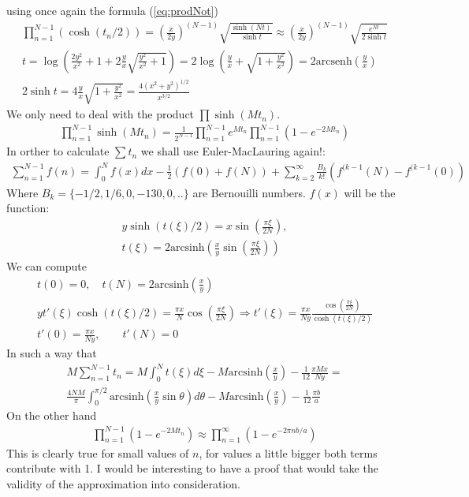 \documentclass[12pt]{article}
\begin{document}
using once again the formula (\ref{eq:prodNot})
\begin{gather}
\prod_{n=1}^{N-1}\left(\cosh(t_n/2)\right)=\left(\frac{x}{2y}\right)^{(N-1)}\sqrt{\frac{\sinh(Nt)}{\sinh t}}
\approx \left(\frac{x}{2y}\right)^{(N-1)} \sqrt{\frac{e^{Nt}}{2\sinh t}}\\
t=\log\left(\frac{2y^2}{x^2}+1+2\frac{y}{x}\sqrt{\frac{y^2}{x^2}+1}\right)=2\log\left(\frac{y}{x}+\sqrt{1+\frac{y^2}{x^2}}\right)=2\textrm{arcsenh}\left(\frac{y}{x}\right)\\
2\sinh t=4\frac{y}{x}\sqrt{1+\frac{y^2}{x^2}}=\frac{4\left(x^2+y^2\right)^{1/2}}{x^{3/2}}
\end{gather}
We only need to deal with the product $\prod \sinh(Mt_n)$.
\begin{gather}
\prod_{n=1}^{N-1}\sinh(Mt_n)=\frac{1}{2^{N-1}} \prod_{n=1}^{N-1}e^{Mt_n} \prod_{n=1}^{N-1}(1-e^{-2Mt_n})
\end{gather}
In orther to calculate $\sum t_n$ we shall use Euler-MacLauring again!:
\begin{gather}
\sum_{n=1}^{N-1}f(n)=\int_0^N f(x)dx-\frac{1}{2}\left(f(0)+f(N)\right)+\sum_{k=2}^\infty\frac{B_{k}}{k!}\left(f^{(k-1}(N)-f^{(k-1}(0)\right)
\end{gather}
Where $B_{k}=\{-1/2,1/6,0,-130,0,..\}$ are Bernouilli numbers. $f(x)$ will be the function:
\begin{gather}
y\sinh\left(t\left(\xi\right)/2\right)=x\sin\left(\frac{\pi \xi}{2N}\right), \\
t\left(\xi\right)=2\textrm{arcsinh}\left(\frac{x}{y}\sin\left(\frac{\pi \xi}{2N}\right)\right)
\end{gather}
We can compute
\begin{gather}
t(0)=0,\quad t(N)=2\textrm{arcsinh}\left(\frac{x}{y}\right) \\
yt'(\xi)\cosh\left(t\left(\xi\right)/2\right)=\frac{\pi x}{N}\cos\left(\frac{\pi \xi}{2N}\right)\Rightarrow t'(\xi)=\frac{\pi x}{Ny}\frac{\cos\left(\frac{\pi \xi}{2N}\right)}{\cosh\left(t\left(\xi\right)/2\right)} \\
t'(0)=\frac{\pi x}{Ny},\qquad t'(N)=0
\end{gather}
In such a way that
\begin{gather}
M\sum_{n=1}^{N-1}t_n=M\int_0^N t\left(\xi\right)d\xi-M\textrm{arcsinh}\left(\frac{x}{y}\right)-\frac{1}{12}\frac{\pi Mx}{Ny}=  \\
\frac{4NM}{\pi}\int_0^{\pi/2}\textrm{arcsinh}\left(\frac{x}{y}\sin\theta\right)d\theta-M\textrm{arcsinh}\left(\frac{x}{y}\right)-\frac{1}{12}\frac{\pi b}{a}
\end{gather}
On the other hand
\begin{gather}
\prod_{n=1}^{N-1}\left(1-e^{-2Mt_n}\right)\approx \prod_{n=1}^\infty\left(1-e^{-2\pi nb/a}\right)
\end{gather}
This is clearly true for small values of $n$, for values a little bigger both terms contribute with 1. I would be interesting to have a proof that would take the validity of the approximation into consideration.
\end{document}
